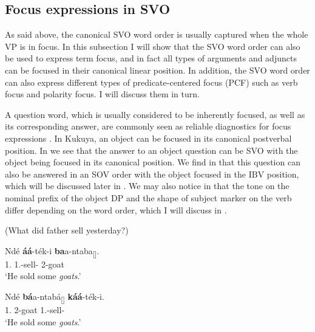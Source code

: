 \documentclass[output=paper,colorlinks,citecolor=brown,
]{langscibook}
\begin{document}
\subsection{Focus expressions in SVO}\label{teke:sec:2.2}
As said above, the canonical SVO word order is usually captured when the whole VP is in focus. In this subsection I will show that the SVO word order can also be used to express term focus, and in fact all types of arguments and adjuncts can be focused in their canonical linear position. In addition, the SVO word order can also express different types of predicate-centered focus (PCF) such as verb focus and polarity focus. I will discuss them in turn.

A question word, which is usually considered to be inherently focused, as well as its corresponding answer, are commonly seen as reliable diagnostics for focus expressions \citep{Rooth1992, Lambrecht1994, Krifka2007, vanderWal2016}. In Kukuya, an object can be focused in its canonical postverbal position. In  we see that the answer to an object question can be SVO with the object being focused in its canonical position. We find in  that this question can also be answered in an SOV order with the object focused in the IBV position, which will be discussed later in . We may also notice in  that the tone on the nominal prefix of the object DP and the shape of subject marker on the verb differ depending on the word order, which I will discuss in .
\begin{exe}
    \ex (What did father sell yesterday?) \label{5}
    \begin{xlist}
\ex
\label{5a}
\gll
Ndé \textbf{áá}-ték-i \textbf{ba}a-ntaba\textsubscript{[\FOC{}]}.\\
1.\Pro{} 1\Sm{}.\Pst{}-sell-\Pst{} 2-goat\\
\trans ‘He sold some \textit{goats}.’ 

\ex
\label{5b}
\gll
Ndé \textbf{bá}a-ntabá\textsubscript{[\FOC{}]} \textbf{káá}-ték-i.\\
1.\Pro{} 2-goat 1\Sm{}.\Pst{}-sell-\Pst{}\\
\trans ‘He sold some \textit{goats}.’ 

    \end{xlist}
\end{exe} 
\end{document}
